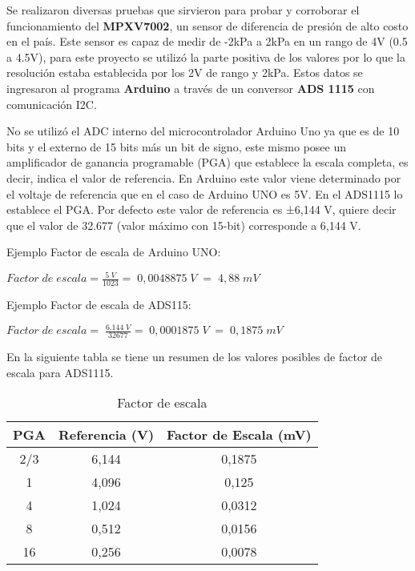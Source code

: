 Se realizaron diversas pruebas que sirvieron para probar y corroborar el funcionamiento del \textbf{MPXV7002}, un sensor de diferencia de presión de alto costo en el país. Este sensor es capaz de medir de -2kPa a 2kPa en un rango de 4V (0.5 a 4.5V), para este proyecto se utilizó la parte positiva de los valores por lo que la resolución estaba establecida por los 2V de rango y 2kPa. Estos datos se ingresaron al programa \textbf{Arduino} a través de un conversor \textbf{ADS 1115} con comunicación I2C.

No se utilizó el ADC interno del microcontrolador Arduino Uno ya que es de 10 bits y el externo de 15 bits más un bit de signo, este mismo posee un amplificador de ganancia programable (PGA) que establece la escala completa, es decir, indica el valor de referencia. En Arduino este valor viene determinado por el voltaje de referencia que en el caso de Arduino UNO es 5V. En el ADS1115 lo establece el PGA. Por defecto este valor de referencia es ±6,144 V, quiere decir que el valor de 32.677 (valor máximo con 15-bit) corresponde a 6,144 V.

Ejemplo Factor de escala de Arduino UNO:
\begin{center}
	\begin{math}Factor\;de\;escala=\frac{5\;V}{1023}=\;0,0048875\;V\;=\;4,88\;mV
	\end{math}
\end{center}
Ejemplo Factor de escala de ADS115:
\begin{center}
	\begin{math}Factor\;de\;escala=\;\frac{6.144\;V}{32677}=\;0,0001875\;V\;=\;0,1875\;mV
	\end{math}
\end{center}

En la siguiente tabla se tiene un resumen de los valores posibles de factor de escala para ADS1115.
\begin{table}[h]
	\centering
	
	\begin{tabular}{|c|c|c|}
		\hline
		\textbf{PGA} & \textbf{Referencia (V)} & \textbf{Factor de Escala (mV)} \\ \hline
		2/3          & 6,144                   & 0,1875                         \\ \hline
		1            & 4,096                   & 0,125                          \\ \hline
		4            & 1,024                   & 0,0312                         \\ \hline
		8            & 0,512                   & 0,0156                         \\ \hline
		16           & 0,256                   & 0,0078                         \\ \hline
	\end{tabular}
\caption{Factor de escala}
\end{table}

